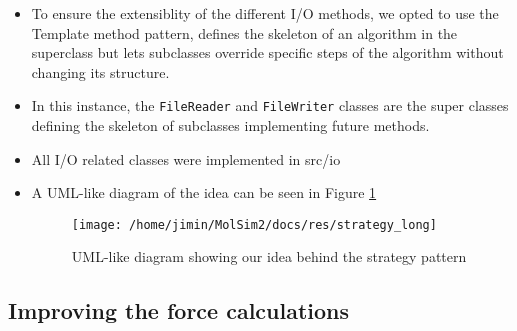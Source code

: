 \documentclass{article}
\begin{document}
\begin{itemize}
    \item To ensure the extensiblity of the different I/O methods, we opted to use the Template method pattern,  defines the skeleton of an algorithm in the superclass but lets subclasses override specific steps of the algorithm without changing its structure.
    \item In this instance, the \verb|FileReader| and \verb|FileWriter| classes are the super classes defining the skeleton of subclasses implementing future methods. 
    \item All I/O related classes were implemented in src/io

    \item A UML-like diagram of the idea can be seen in Figure \ref{fig:strat}
    \begin{figure}[H]
        \texttt{[image: /home/jimin/MolSim2/docs/res/strategy\_long]}
        \caption{UML-like diagram showing our idea behind the strategy pattern}
        \label{fig:strat}
    \end{figure}

\end{itemize}

\subsection{Improving the force calculations}
\label{sec:Refactoring:forceimprovements}
\end{document}
